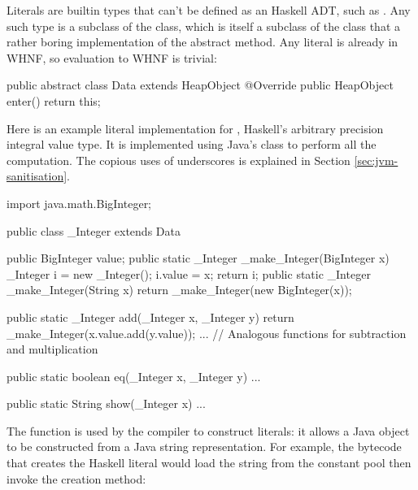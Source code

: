 \documentclass[dissertation.tex]{subfiles}
\begin{document}
{{{            Literals are builtin types that can't be defined as an Haskell ADT, such as . Any such type
            is a subclass of the  class, which is itself a subclass of the  class that a
            rather boring implementation of the abstract  method. Any literal is already in WHNF, so
            evaluation to WHNF is trivial:

            \begin{javafigure}
            public abstract class Data extends HeapObject {
                @Override
                public HeapObject enter() {
                    return this;
                }
            }
            \end{javafigure}

            Here is an example literal implementation for , Haskell's arbitrary precision integral
            value type. It is implemented using Java's  class to perform all the computation. The
            copious uses of underscores is explained in Section \ref{sec:jvm-sanitisation}.

            \begin{javafigure}
            import java.math.BigInteger;

            public class _Integer extends Data {
                public BigInteger value;
                public static _Integer _make_Integer(BigInteger x) {
                    _Integer i = new _Integer();
                    i.value = x;
                    return i;
                }
                public static _Integer _make_Integer(String x) {
                    return _make_Integer(new BigInteger(x));
                }

                public static _Integer add(_Integer x, _Integer y) {
                    return _make_Integer(x.value.add(y.value));
                }
                ... // Analogous functions for subtraction and multiplication

                public static boolean eq(_Integer x, _Integer y) { ... }

                public static String show(_Integer x) { ... }
            }
            \end{javafigure}

            The  function is used by the compiler to construct  literals:
            it allows a Java  object to be constructed from a Java string representation. For example,
            the bytecode that creates the Haskell literal  would load the string  from the
            constant pool then invoke the creation method:

}}}
\end{document}
